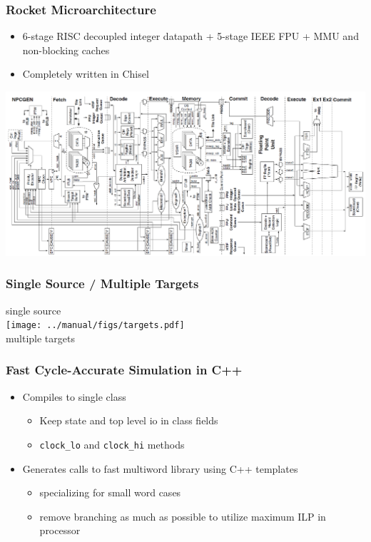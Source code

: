 \documentclass[xcolor=pdflatex,dvipsnames,table]{beamer}
\begin{document}
\begin{frame}[fragile]
\frametitle{Rocket Microarchitecture}
\begin{itemize}
\item 6-stage RISC decoupled integer datapath + 5-stage IEEE FPU + MMU
  and non-blocking caches
\item Completely written in Chisel
\end{itemize}
\includegraphics[width=\textwidth]{figs/rocket-microarchitecture.pdf}

\end{frame}

\begin{frame}[fragile]
\frametitle{Single Source / Multiple Targets}

\begin{center}
single source \\
\texttt{[image: ../manual/figs/targets.pdf]} \\
multiple targets \
\end{center}

\end{frame}


\begin{frame}[fragile]
\frametitle{Fast Cycle-Accurate Simulation in C++}

\begin{itemize}
\item Compiles to single class 
\begin{itemize}
\item Keep state and top level io in class fields
\item \verb+clock_lo+ and \verb+clock_hi+ methods
\end{itemize}
\item Generates calls to fast multiword library using C++ templates 
\begin{itemize}
\item specializing for small word cases
\item remove branching as much as possible to utilize maximum ILP in processor
\end{itemize}
\end{itemize}

\end{frame}
\end{document}
